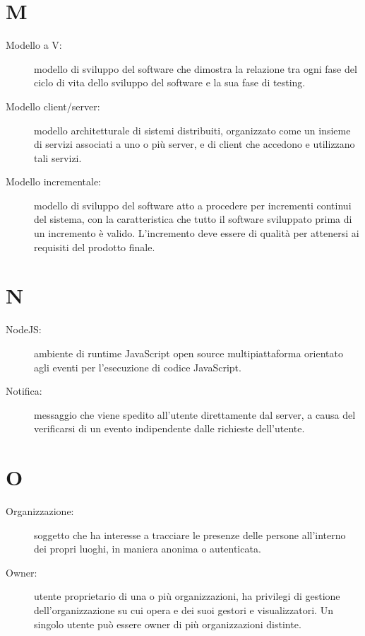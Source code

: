 \documentclass{article}
\begin{document}
	\section{M}
	\begin{description}
		\item[Modello a V:] modello di sviluppo del software che dimostra la relazione tra ogni fase del ciclo di vita dello sviluppo del software e la sua fase di testing.
		\item[Modello client/server:] modello architetturale di sistemi distribuiti, organizzato come un insieme di servizi associati a uno o più server, e di client che accedono e utilizzano tali servizi.
		\item[Modello incrementale:] modello di sviluppo del software atto a procedere per incrementi continui del sistema, con la caratteristica che tutto il software sviluppato prima di un incremento è valido. L'incremento deve essere di qualità per attenersi ai requisiti del prodotto finale.
	\end{description}
	\newpage
	\section{N}
	\begin{description}
		\item[NodeJS:] ambiente di runtime JavaScript open source multipiattaforma orientato agli eventi per l'esecuzione di codice JavaScript.
		\item[Notifica:] messaggio che viene spedito all'utente direttamente dal server, a causa del verificarsi di un evento indipendente dalle richieste dell'utente.
	\end{description}
	\newpage
	\section{O}
	\begin{description}
		\item[Organizzazione:] soggetto che ha interesse a tracciare le presenze delle persone all'interno dei propri luoghi, in maniera anonima o autenticata.
		\item[Owner:] utente proprietario di una o più organizzazioni, ha privilegi di gestione dell'organizzazione su cui opera e dei suoi gestori e visualizzatori. Un singolo utente può essere owner di più organizzazioni distinte.
	\end{description}
	\newpage
\end{document}

